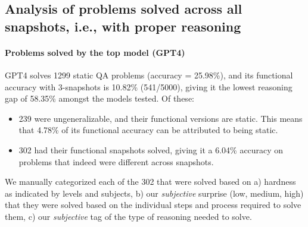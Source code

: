 \documentclass[11pt,a4paper]{article}
\begin{document}
\subsection{Analysis of problems solved across all snapshots, i.e., with proper reasoning}
\label{result:fn-solved}

\paragraph{Problems solved by the top model (GPT4)}
GPT4 solves 1299 static QA problems (accuracy = 25.98\%), and its functional accuracy with 3-snapshots is 10.82\% (541/5000), giving it the lowest reasoning gap of 58.35\% amongst the models tested. Of these:
\begin{itemize}
  \item 239 were ungeneralizable, and their functional versions are static. This means that 4.78\% of its functional accuracy can be attributed to being static.
  \item 302 had their functional snapshots solved, giving it a 6.04\% accuracy on problems that indeed were different across snapshots.
\end{itemize}
We manually categorized each of the 302 that were solved based on a) hardness as indicated by levels and subjects, b) our {\em subjective} surprise (low, medium, high) that they were solved based on the individual steps and process required to solve them, c) our {\em subjective} tag of the type of reasoning needed to solve.
\end{document}

